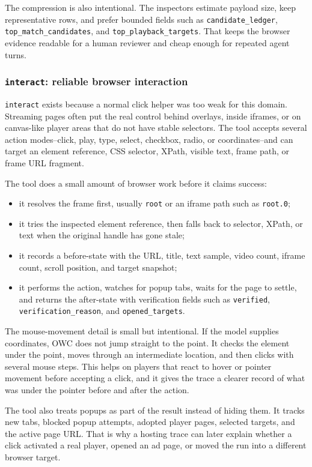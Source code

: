 The compression is also intentional. The inspectors estimate payload size, keep
representative rows, and prefer bounded fields such as \texttt{candidate\_ledger},
\texttt{top\_match\_candidates}, and \texttt{top\_playback\_targets}. That keeps the
browser evidence readable for a human reviewer and cheap enough for repeated agent turns.

\subsubsection{\texttt{interact}: reliable browser interaction}

\texttt{interact} exists because a normal click helper was too weak for this domain.
Streaming pages often put the real control behind overlays, inside iframes, or on
canvas-like player areas that do not have stable selectors. The tool accepts several
action modes--click, play, type, select, checkbox, radio, or coordinates--and can target
an element reference, CSS selector, XPath, visible text, frame path, or frame URL
fragment.

The tool does a small amount of browser work before it claims success:
\begin{itemize}
  \item it resolves the frame first, usually \texttt{root} or an iframe path such as
  \texttt{root.0};
  \item it tries the inspected element reference, then falls back to selector, XPath, or
  text when the original handle has gone stale;
  \item it records a before-state with the URL, title, text sample, video count, iframe
  count, scroll position, and target snapshot;
  \item it performs the action, watches for popup tabs, waits for the page to settle, and
  returns the after-state with verification fields such as \texttt{verified},
  \texttt{verification\_reason}, and \texttt{opened\_targets}.
\end{itemize}

The mouse-movement detail is small but intentional. If the model supplies coordinates,
OWC does not jump straight to the point. It checks the element under the point, moves
through an intermediate location, and then clicks with several mouse steps. This helps on
players that react to hover or pointer movement before accepting a click, and it gives
the trace a clearer record of what was under the pointer before and after the action.

The tool also treats popups as part of the result instead of hiding them. It tracks new
tabs, blocked popup attempts, adopted player pages, selected targets, and the active page
URL. That is why a hosting trace can later explain whether a click activated a real
player, opened an ad page, or moved the run into a different browser target.

